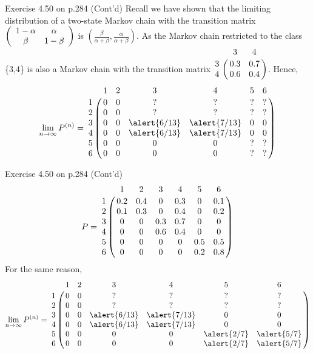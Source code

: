 \documentclass[letterpaper,handout, mathserif]{beamer}
\begin{document}
\begin{frame}{Exercise 4.50 on p.284 (Cont'd)}
Recall we have shown that the limiting distribution of a two-state Markov chain
with the transition matrix
$\left(
\begin{array}{cc}
1-\alpha  & \alpha\cr
\beta & 1-\beta
\end{array}\right)
$
is $\left(\frac{\beta}{\alpha+\beta},\frac{\alpha}{\alpha+\beta}\right).$
As the Markov chain restricted to the class \{3,4\} is also a Markov chain
with the transition matrix
$
\bordermatrix{%
  &  3  &  4  \cr
3 & 0.3 & 0.7 \cr
4 & 0.6 & 0.4
}
$.
Hence,
\[
\lim_{n\to\infty}P^{(n)}=
\bordermatrix{%
  &  1  &  2  &  3  &  4  &  5  &  6 \cr
1 & 0 & 0 &  ?  &  ?  &  ?  &  ? \cr
2 & 0 & 0 &  ?  &  ?  &  ?  &  ? \cr
3 & 0 & 0 & \alert{6/13} & \alert{7/13} & 0 & 0\cr
4 & 0 & 0 & \alert{6/13} & \alert{7/13} & 0 & 0\cr
5 & 0 & 0 & 0 & 0 &  ?  &  ? \cr
6 & 0 & 0 & 0 & 0 &  ?  &  ?
}
\]
\end{frame}
\begin{frame}{Exercise 4.50 on p.284 (Cont'd)}
\[
P=
\bordermatrix{%
  &  1  &  2  &  3  &  4  &  5  &  6 \cr
1 & 0.2 & 0.4 &  0  & 0.3 &  0  & 0.1\cr
2 & 0.1 & 0.3 &  0  & 0.4 &  0  & 0.2\cr
3 &  0  &  0  & 0.3 & 0.7 &  0  &  0 \cr
4 &  0  &  0  & 0.6 & 0.4 &  0  &  0 \cr
5 &  0  &  0  &  0  &  0  & 0.5 & 0.5\cr
6 &  0  &  0  &  0  &  0  & 0.2 & 0.8
}
\]
For the same reason,
\[
\lim_{n\to\infty}P^{(n)}=
\bordermatrix{%
  &  1  &  2  &  3  &  4  &  5  &  6 \cr
1 & 0 & 0 &  ?  &  ?  &  ?  &  ? \cr
2 & 0 & 0 &  ?  &  ?  &  ?  &  ? \cr
3 & 0 & 0 & \alert{6/13} & \alert{7/13} & 0 & 0\cr
4 & 0 & 0 & \alert{6/13} & \alert{7/13} & 0 & 0\cr
5 & 0 & 0 & 0 & 0 & \alert{2/7} & \alert{5/7} \cr
6 & 0 & 0 & 0 & 0 & \alert{2/7} & \alert{5/7}
}
\]

\end{frame}
\end{document}
